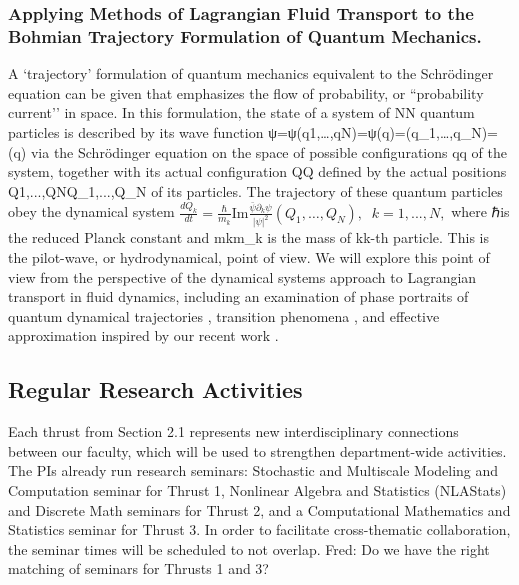 \documentclass[11pt]{NSFamsart}
\newcommand{\FredNote}[1]{{\color{blue} Fred: #1}}
\begin{document}
\subsubsection*{Applying Methods of Lagrangian Fluid Transport to the Bohmian Trajectory Formulation of Quantum Mechanics.}   A `trajectory'  formulation of quantum mechanics  equivalent to the Schr\"{o}dinger equation can be given \cite{Bohmian, Holland1993TheQT} that emphasizes the flow of probability, or ``probability current’’ in space. 
In this formulation, the state of a system of NN quantum particles is described by its wave function ψ=ψ(q1,…,qN)=ψ(q)\psi=\psi(q_1,…,q_N)=\psi(q) via the Schr\"{o}dinger equation  on the space of possible configurations qq of the system, together with its actual configuration QQ defined by the actual positions Q1,...,QNQ_1,...,Q_N of its particles. The trajectory of these quantum particles obey the dynamical system
$
\frac{dQ_k}{dt}= \frac{\hbar}{m_k} \text{Im} \frac{\bar\psi  \partial_k \psi}{|\psi|^2}(Q_1,…,Q_N),\;\; k=1, ..., N,  
$
where ℏ\hbar is the reduced Planck constant and mkm_k is the mass of kk-th particle.
This is the pilot-wave, or hydrodynamical, point of view. We will explore this point of view from the perspective of the dynamical systems approach to Lagrangian transport in fluid dynamics, including an examination of phase portraits of quantum dynamical trajectories \cite{Berndl1995OnTG}, transition phenomena \cite{waalkens2007wigner,Micha2006QuantumDW, Dittrich2016}, and effective approximation inspired by our recent work \cite{Li2021BohmianTO}. 
\fi


\subsection{Regular Research  Activities}\label{section:regular research activities}
Each thrust from Section 2.1 represents new interdisciplinary connections between our faculty, which will be used to strengthen department-wide activities. The PIs already run  research seminars: 
Stochastic and Multiscale Modeling and Computation seminar for Thrust 1, Nonlinear Algebra and Statistics (NLAStats) and Discrete Math seminars for Thrust 2, and a Computational Mathematics and Statistics seminar for Thrust 3.
In order to facilitate cross-thematic collaboration, the seminar times will be scheduled to not overlap. \FredNote{Do we have the right matching of seminars for Thrusts 1 and 3?}
\end{document}
